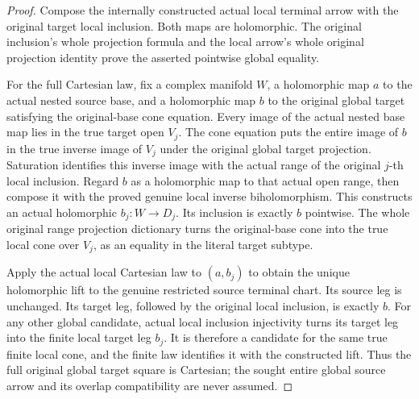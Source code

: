 \begin{proof}
Compose the internally constructed actual local terminal arrow with the
original target local inclusion. Both maps are holomorphic. The original
inclusion's whole projection formula and the local arrow's whole original
projection identity prove the asserted pointwise global equality.

For the full Cartesian law, fix a complex manifold $W$, a holomorphic
map $a$ to the actual nested source base, and a holomorphic map $b$ to
the original global target satisfying the original-base cone equation.
Every image of the actual nested base map lies in the true target open
$V_j$. The cone equation puts the entire image of $b$ in the true inverse
image of $V_j$ under the original global target projection. Saturation
identifies this inverse image with the actual range of the original
$j$-th local inclusion. Regard $b$ as a holomorphic map to that actual
open range, then compose it with the proved genuine local inverse
biholomorphism. This constructs an actual holomorphic $b_j:W\to D_j$.
Its inclusion is exactly $b$ pointwise. The whole original range projection
dictionary turns the original-base cone into the true local cone over
$V_j$, as an equality in the literal target subtype.

Apply the actual local Cartesian law to $(a,b_j)$ to obtain the unique
holomorphic lift to the genuine restricted source terminal chart. Its
source leg is unchanged. Its target leg, followed by the original local
inclusion, is exactly $b$. For any other global candidate, actual local
inclusion injectivity turns its target leg into the finite local target
leg $b_j$. It is therefore a candidate for the same true finite local
cone, and the finite law identifies it with the constructed lift. Thus
the full original global target square is Cartesian; the sought entire
global source arrow and its overlap compatibility are never assumed.
\end{proof}
